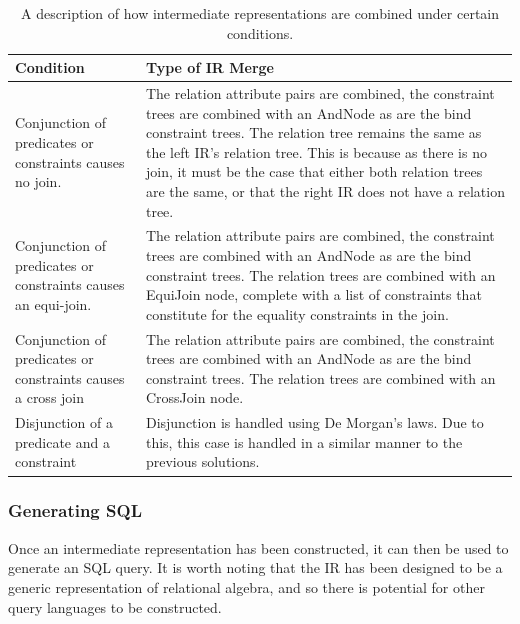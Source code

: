 \documentclass[a4paper, 11pt]{article}
\begin{document}
      \begin{table}
        \begin{tabular}{ | 
          p{} |
          p{} |
        }

        \hline
        Condition & Type of IR Merge \\
        \hline

        Conjunction of predicates or constraints causes no join.
        & 
        The relation attribute pairs are combined, the constraint trees are
        combined with an AndNode as are the bind constraint trees. The relation
        tree remains the same as the left IR's relation tree. This is because
        as there is no join, it must be the case that either both
        relation trees are the same, or that the right IR does not have a
        relation tree.
        \\\hline
        Conjunction of predicates or constraints causes an equi-join.
        & 
        The relation attribute pairs are combined, the constraint trees are
        combined with an AndNode as are the bind constraint trees. The relation
        trees are combined with an EquiJoin node, complete with a list of
        constraints that constitute for the equality constraints in the join.
        \\\hline
        Conjunction of predicates or constraints causes a cross join
        & 
        The relation attribute pairs are combined, the constraint trees are
        combined with an AndNode as are the bind constraint trees. The relation
        trees are combined with an CrossJoin node.
        \\\hline
        Disjunction of a predicate and a constraint
        & 
        Disjunction is handled using De Morgan's laws. Due to this, this case
        is handled in a similar manner to the previous solutions.
        \\\hline
      \end{tabular}
        \caption{A description of how intermediate representations are combined
          under certain conditions.}
        \label{ircomb}
    \end{table}

      \subsubsection{Generating SQL}
        Once an intermediate representation has been constructed, it can then
        be used to generate an SQL query. It is worth noting that the IR has
        been designed to be a generic representation of relational algebra, and
        so there is potential for other query languages to be constructed.
\end{document}
